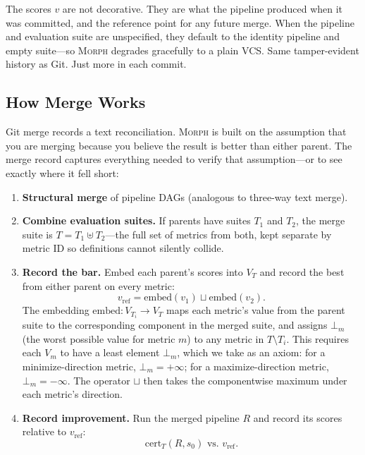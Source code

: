 \documentclass{article}
\begin{document}
The scores $v$ are not decorative. They are what the pipeline produced when it
was committed, and the reference point for any future merge. When the pipeline
and evaluation suite are unspecified, they default to the identity pipeline and
empty suite---so \textsc{Morph} degrades gracefully to a plain VCS. Same
tamper-evident history as Git. Just more in each commit.

\subsection{How Merge Works}

Git merge records a text reconciliation. \textsc{Morph} is built on the
assumption that you are merging because you believe the result is better than
either parent. The merge record captures everything needed to verify that
assumption---or to see exactly where it fell short:

\begin{enumerate}[nosep]
  \item \textbf{Structural merge} of pipeline DAGs (analogous to three-way
    text merge).
  \item \textbf{Combine evaluation suites.} If parents have suites $T_1$
    and $T_2$, the merge suite is $T = T_1 \uplus T_2$---the full set of
    metrics from both, kept separate by metric ID so definitions cannot
    silently collide.
  \item \textbf{Record the bar.} Embed each parent's scores into $V_T$
    and record the best from either parent on every metric:
  \begin{equation}
    v_{\text{ref}} = \text{embed}(v_1) \sqcup \text{embed}(v_2).
  \end{equation}
  The embedding $\text{embed} : V_{T_i} \to V_T$ maps each metric's value
  from the parent suite to the corresponding component in the merged suite,
  and assigns $\bot_m$ (the worst possible value for metric $m$) to any
  metric in $T \setminus T_i$. This requires each $V_m$ to have a least
  element $\bot_m$, which we take as an axiom: for a minimize-direction
  metric, $\bot_m = +\infty$; for a maximize-direction metric, $\bot_m = -\infty$.
  The operator $\sqcup$ then takes the componentwise maximum under each
  metric's direction.
  \item \textbf{Record improvement.} Run the merged pipeline $R$ and record
    its scores relative to $v_{\text{ref}}$:
  \begin{equation}
    \text{cert}_T(R, s_0) \text{ vs. } v_{\text{ref}}.
    \label{eq:merge-dom}
  \end{equation}
\end{enumerate}
\end{document}
